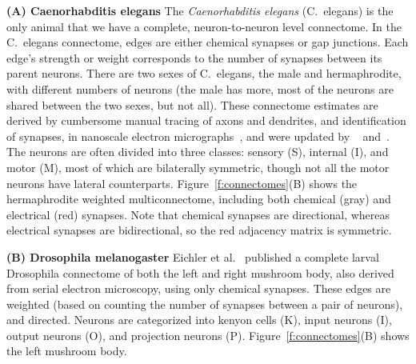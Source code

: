 \documentclass[11pt]{article}
\begin{document}
\textbf{(A) Caenorhabditis elegans}
	The  \emph{Caenorhabditis elegans} (C.~elegans) is the only animal that we have a complete, neuron-to-neuron level connectome. In the C.~elegans connectome, edges are either chemical synapses or gap junctions.  Each edge's strength or weight corresponds to the number of synapses between its parent neurons. There are two sexes of C.~elegans, the male and hermaphrodite, with different numbers of neurons (the male has more, most of the neurons are shared between the two sexes, but not all).  
    These connectome estimates  are derived by cumbersome manual tracing of axons and dendrites, and identification of synapses, in nanoscale electron micrographs~\cite{White1986-rd}, and were updated by ~\citet{Varshney2011-rc} and~\cite{Bentley2016-jy}. 
    The neurons are  often divided into  three classes: sensory (S), internal (I), and motor (M), most of which are bilaterally symmetric, though not all the motor neurons have lateral counterparts. 
    Figure~\ref{f:connectomes}(B) shows the hermaphrodite weighted multiconnectome, including both chemical (gray) and electrical (red)  synapses.  Note that chemical synapses are directional, whereas electrical synapses are bidirectional, so the red adjacency matrix is symmetric.
    
	\textbf{(B) Drosophila melanogaster}
	Eichler et al.~\cite{Eichler2017-yi} published a complete larval Drosophila connectome of both the left and right mushroom body, also derived from serial electron microscopy, using only chemical synapses. These edges are weighted (based on  counting the  number of synapses between a pair of neurons), and  directed.
	Neurons are categorized  into  kenyon cells (K), input neurons (I), output neurons (O), and projection neurons (P).  Figure~\ref{f:connectomes}(B) shows the left mushroom body.
\end{document}
